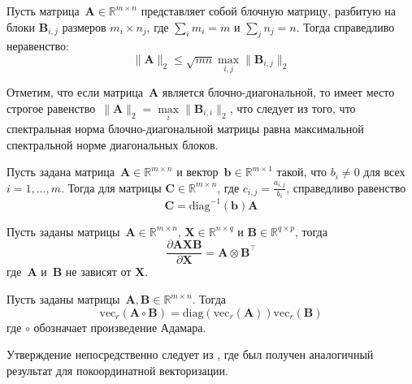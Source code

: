 \begin{property}\label{prop:block_matrix_norm}
    Пусть матрица~$\mathbf{A} \in \mathbb{R}^{m \times n}$ представляет собой блочную матрицу, разбитую на блоки $\mathbf{B}_{i,j}$ размеров $m_i \times n_j$, где $\sum_i m_i = m$ и $\sum_j n_j = n$. Тогда справедливо неравенство:
    \begin{equation}
        \| \mathbf{A} \|_2 \leq \sqrt{m n} \max\limits_{i,j}\| \mathbf{B}_{i,j}\|_2
    \end{equation}

    Отметим, что если матрица~$\mathbf{A}$ является блочно-диагональной, то имеет место строгое равенство~$\| \mathbf{A} \|_2 = \max\limits_{i}\| \mathbf{B}_{i,i}\|_2$, что следует из того, что спектральная норма блочно-диагональной матрицы равна максимальной спектральной норме диагональных блоков.
\end{property}

\begin{property}\label{prop:elem_wise_division}
    Пусть задана матрица~$\mathbf{A} \in \mathbb{R}^{m\times n}$ и вектор~$\mathbf{b} \in \mathbb{R}^{m \times 1}$ такой, что $b_i \neq 0$ для всех $i = 1, \ldots, m$. Тогда для матрицы $\mathbf{C} \in \mathbb{R}^{m \times n}$, где $c_{i,j} = \frac{a_{i,j}}{b_i}$, справедливо равенство
    \begin{equation}
        \mathbf{C} = \mathrm{diag}^{-1}(\mathbf{b})\mathbf{A}
    \end{equation}
\end{property}

\begin{property}\label{prop:matrix_product_derivative}
    Пусть заданы матрицы~$\mathbf{A} \in \mathbb{R}^{m \times n}$, $\mathbf{X} \in \mathbb{R}^{n \times q}$ и $\mathbf{B} \in \mathbb{R}^{q \times p}$, тогда
    \begin{equation}
        \frac{\partial\mathbf{A}\mathbf{X}\mathbf{B}}{\partial\mathbf{X}} = \mathbf{A} \otimes \mathbf{B}^\top
    \end{equation}
    где~$\mathbf{A}$ и~$\mathbf{B}$ не зависят от $\mathbf{X}$.
\end{property}

\begin{property} \label{prop:vec_r_hadamard_product}
    Пусть заданы матрицы~$\mathbf{A}, \mathbf{B} \in \mathbb{R}^{m \times n}$. Тогда
    \begin{equation}
        \mathrm{vec}_r(\mathbf{A} \circ \mathbf{B}) = \mathrm{diag}(\mathrm{vec}_r(\mathbf{A})) \mathrm{vec}_r(\mathbf{B})
    \end{equation}
    где $\circ$ обозначает произведение Адамара.

    Утверждение непосредственно следует из \cite{magnus1988matrix}, где был получен аналогичный результат для покоординатной векторизации.
\end{property}

